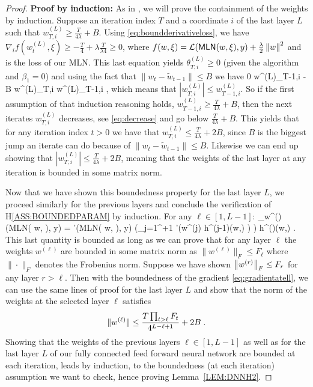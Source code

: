 \documentclass[wcp]{jmlr}
\begin{document}
\begin{proof}
\textbf{Proof by induction:} As in \citet{defossez2020convergence}, we will prove the containment of the weights by induction.
Suppose an iteration index $T$ and a coordinate $i$ of the last layer $L$ such that $w^{(L)}_{T, i} \geq \frac{T}{4\lambda} + B$.
Using \eqref{eq:boundderivativeloss}, we have $
\nabla_i f(w^{(L)}_t, \xi) \geq - \frac{T}{4} + \lambda \frac{T}{\lambda4} \geq 0 $,
where $f(w, \xi) = \mathcal{L}(\textsf{MLN}( w, \xi), y) +\frac{\lambda}{2}\norm{w}^2$ and is the loss of our MLN.
This last equation yields $\theta^{(L)}_{T,i} \geq 0$ (given the algorithm and $\beta_1 = 0$) and using the fact that $\|w_t - \tilde{w}_{t-1}\| \leq B$ we have
\beq\label{eq:decrease}
0 \leq w^{(L)}_{T-1,i} - B \leq w^{(L)}_{T,i} \leq w^{(L)}_{T-1,i} \eqsp,
\eeq
which means that $| w^{(L)}_{T,i}| \leq w^{(L)}_{T-1,i}$.
So if the first assumption of that induction reasoning holds, \ie $w^{(L)}_{T-1, i} \geq \frac{T}{4\lambda} + B$, then the next iterates $w^{(L)}_{T, i}$ decreases, see \eqref{eq:decrease} and go below $\frac{T}{4\lambda} + B$. This yields that for any iteration index $t >0$ we have that $w^{(L)}_{T, i} \leq \frac{T}{4\lambda} + 2B$,
since $B$ is the biggest jump an iterate can do because of $\|w_t - \tilde{w}_{t-1}\| \leq B$.
Likewise we can end up showing that $|w^{(L)}_{T, i}| \leq \frac{T}{4\lambda} + 2B$, meaning that the weights of the last layer at any iteration is bounded in some matrix norm.

Now that we have shown this boundedness property for the last layer $L$, we proceed similarly for the previous layers and conclude the verification of H\ref{ASS:BOUNDEDPARAM} by induction.
For any $\ell \in [1, L-1]$:
\beq\label{eq:gradientatell}
\nabla_{w^{(\ell)}}  (\textsf{MLN}( w, \xi), y)  =  '(\textsf{MLN}( w, \xi), y) \left(\prod_{j=1}^{\ell+1} \sigma'\left(w^{(j)} h^{(j-1)}(w,\xi) \right) \right) h^{()}(w,\xi)  \eqsp.
\eeq
This last quantity is bounded as long as we can prove that for any layer $\ell$ the weights $w^{(\ell)}$ are bounded in some matrix norm as $\|w^{(\ell)}\|_{F} \leq F_\ell$ where $\|\cdot\|_{F}$ denotes the Frobenius norm.
Suppose we have shown $\norm{w^{(r)}}_{F} \leq F_r$ for any layer $r > \ell$. 
Then with the boundedness of the gradient \eqref{eq:gradientatell}, we can use the same lines of proof for the last layer $L$ and show that the norm of the weights at the selected layer $\ell$ satisfies
$$
\|w^{(\ell)}\| \leq \frac{T \prod_{t > \ell} F_t}{4^{L-\ell+1}} + 2B\eqsp.
$$
Showing that the weights of the previous layers $\ell \in [1, L-1]$ as well as for the last layer $L$ of our fully connected feed forward neural network are bounded at each iteration, leads by induction, to the boundedness (at each iteration) assumption we want to check, hence proving Lemma~\ref{LEM:DNNH2}.
\end{proof}
\end{document}
